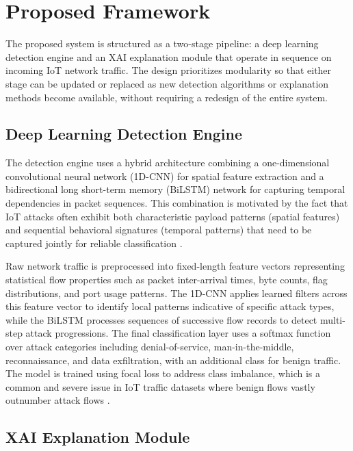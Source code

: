 \documentclass[a4paper,fleqn]{cas-dc}
\numberwithin{equation}{section}
\begin{document}
\section{Proposed Framework}
\label{sec:framework}

The proposed system is structured as a two-stage pipeline: a deep learning detection engine and an XAI explanation module that operate in sequence on incoming IoT network traffic. The design prioritizes modularity so that either stage can be updated or replaced as new detection algorithms or explanation methods become available, without requiring a redesign of the entire system.

\subsection{Deep Learning Detection Engine}

The detection engine uses a hybrid architecture combining a one-dimensional convolutional neural network (1D-CNN) for spatial feature extraction and a bidirectional long short-term memory (BiLSTM) network for capturing temporal dependencies in packet sequences. This combination is motivated by the fact that IoT attacks often exhibit both characteristic payload patterns (spatial features) and sequential behavioral signatures (temporal patterns) that need to be captured jointly for reliable classification \cite{saheed2022explainable, islam2023robust}.

Raw network traffic is preprocessed into fixed-length feature vectors representing statistical flow properties such as packet inter-arrival times, byte counts, flag distributions, and port usage patterns. The 1D-CNN applies learned filters across this feature vector to identify local patterns indicative of specific attack types, while the BiLSTM processes sequences of successive flow records to detect multi-step attack progressions. The final classification layer uses a softmax function over attack categories including denial-of-service, man-in-the-middle, reconnaissance, and data exfiltration, with an additional class for benign traffic. The model is trained using focal loss to address class imbalance, which is a common and severe issue in IoT traffic datasets where benign flows vastly outnumber attack flows \cite{jes2024iot, chen2022explainable}.

\subsection{XAI Explanation Module}
\end{document}
